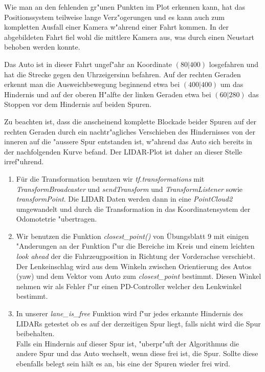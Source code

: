 \documentclass[10pt,oneside,a4paper]{article}
\begin{document}
    Wie man an den fehlenden gr"unen Punkten im Plot erkennen kann, hat das Positionssystem
    teilweise lange Verz"ogerungen und es kann auch zum kompletten Ausfall einer Kamera w"ahrend
    einer Fahrt kommen. In der abgebildeten Fahrt fiel wohl die mittlere Kamera aus, was durch
    einen Neustart behoben werden konnte.

    Das Auto ist in dieser Fahrt ungef"ahr an Koordinate $(80 | 400)$ losgefahren und hat die
    Strecke gegen den Uhrzeigersinn befahren. Auf der rechten Geraden erkennt man die
    Ausweichbewegung beginnend etwa bei $(400 | 400)$ um das Hindernis und auf der oberen H"alfte
    der linken Geraden etwa bei $(60 | 280)$ das Stoppen vor dem Hindernis auf beiden Spuren.

    Zu beachten ist, dass die anscheinend komplette Blockade beider Spuren auf der rechten Geraden
    durch ein nachtr"agliches Verschieben des Hindernisses von der inneren auf die "aussere Spur
    entstanden ist, w"ahrend das Auto sich bereits in der nachfolgenden Kurve befand.
    Der LIDAR-Plot ist daher an dieser Stelle irref"uhrend.
	\begin{enumerate}
    \item Für die Transformation benutzen wir \emph{tf.transformations} mit
        \emph{TransformBroadcaster} und \emph{sendTransform} und \emph{TransformListener} sowie
        \emph{transformPoint}. Die LIDAR Daten werden dann in eine \emph{PointCloud2} umgewandelt
        und durch die Transformation in das Koordinatensystem der Odomotetrie "ubertragen.
    \item Wir benutzen die Funktion \emph{closest\_point()} von Übungsblatt 9 mit einigen
        "Anderungen an der Funktion f"ur die Bereiche im Kreis und einem leichten
        \emph{look ahead} der die Fahrzeugposition in Richtung der Vorderachse verschiebt.\\
        Der Lenkeinschlag wird aus dem Winkeln zwischen Orientierung des Autos (yaw) und dem
        Vektor vom Auto zum \emph{closest\_point} bestimmt. Diesen Winkel nehmen wir als Fehler
        f"ur einen PD-Controller welcher den Lenkwinkel bestimmt.
    \item In unserer \emph{lane\_is\_free} Funktion wird f"ur jedes erkannte Hindernis
        des LIDARs getestet ob es auf der derzeitigen Spur liegt, falls nicht wird die Spur
        beibehalten. \\
        Falls ein Hindernis auf dieser Spur ist, "uberpr"uft der Algorithmus die andere Spur und
        das Auto wechselt, wenn diese frei ist, die Spur. Sollte diese ebenfalls belegt sein hält
        es an, bis eine der Spuren wieder frei wird.
	\end{enumerate}
\end{document}
